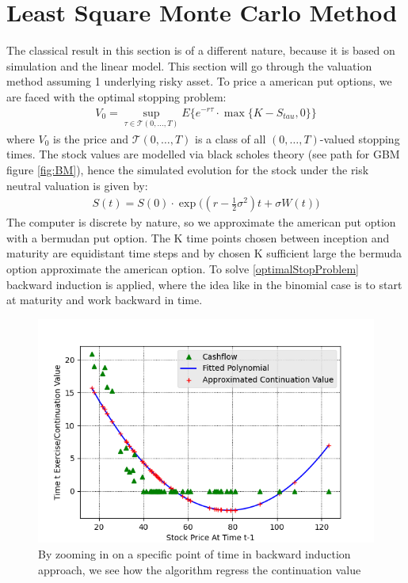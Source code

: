
\section{Least Square Monte Carlo Method}\label{LSM}
The classical result in this section is of a different nature, because it is based on simulation and the linear model. This section will go through the valuation method assuming 1 underlying risky asset. To price a american put options, we are faced with the optimal stopping problem:
\begin{equation}\label{optimalStopProblem}
\begin{split}
V_0 = \sup_{\tau \in \mathcal{T}(0,\ldots,T)} E\{ e^{-r \tau} \cdot \max\{K-S_{tau}, 0 \} \}
\end{split}
\end{equation}
where $V_0$ is the price and $\mathcal{T}(0,\ldots,T)$ is a class of all $(0,\ldots,T)$-valued stopping times. The stock values are modelled via black scholes theory (see path for GBM figure \ref{fig:BM}), hence the simulated evolution for the stock under the risk neutral valuation is given by:
\begin{equation*}
\begin{split}
S(t)=S(0) \cdot \exp \bigg( (r -\frac{1}{2} \sigma^2) t + \sigma W(t) \bigg)
\end{split}
\end{equation*}
The computer is discrete by nature, so we approximate the american put option with a bermudan put option. The K time points chosen between inception and maturity are equidistant time steps and by chosen K sufficient large the bermuda option approximate the american option. To solve \eqref{optimalStopProblem} backward induction is applied, where the idea like in the binomial case is to start at maturity and work backward in time. 

\begin{figure}[H]
\centering
\includegraphics{Figures/LSMFit1.png}
\decoRule
\caption[Polynomial Regression Of Continuation Value]{By zooming in on a specific point of time in backward induction approach, we see how the algorithm regress the continuation value}
\label{fig:LSM1}
\end{figure}

